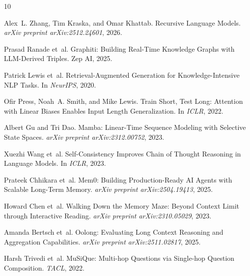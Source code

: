 \documentclass[11pt]{article}
\begin{document}

\begin{thebibliography}{10}

Alex~L. Zhang, Tim Kraska, and Omar Khattab.
\newblock Recursive Language Models.
\newblock \emph{arXiv preprint arXiv:2512.24601}, 2026.

Prasad Ranade et~al.
\newblock Graphiti: Building Real-Time Knowledge Graphs with LLM-Derived Triples.
\newblock Zep AI, 2025.

Patrick Lewis et~al.
\newblock Retrieval-Augmented Generation for Knowledge-Intensive NLP Tasks.
\newblock In \emph{NeurIPS}, 2020.

Ofir Press, Noah~A. Smith, and Mike Lewis.
\newblock Train Short, Test Long: Attention with Linear Biases Enables Input Length Generalization.
\newblock In \emph{ICLR}, 2022.

Albert Gu and Tri Dao.
\newblock Mamba: Linear-Time Sequence Modeling with Selective State Spaces.
\newblock \emph{arXiv preprint arXiv:2312.00752}, 2023.

Xuezhi Wang et~al.
\newblock Self-Consistency Improves Chain of Thought Reasoning in Language Models.
\newblock In \emph{ICLR}, 2023.

Prateek Chhikara et~al.
\newblock Mem0: Building Production-Ready AI Agents with Scalable Long-Term Memory.
\newblock \emph{arXiv preprint arXiv:2504.19413}, 2025.

Howard Chen et~al.
\newblock Walking Down the Memory Maze: Beyond Context Limit through Interactive Reading.
\newblock \emph{arXiv preprint arXiv:2310.05029}, 2023.

Amanda Bertsch et~al.
\newblock Oolong: Evaluating Long Context Reasoning and Aggregation Capabilities.
\newblock \emph{arXiv preprint arXiv:2511.02817}, 2025.

Harsh Trivedi et~al.
\newblock MuSiQue: Multi-hop Questions via Single-hop Question Composition.
\newblock \emph{TACL}, 2022.

\end{thebibliography}
\end{document}

